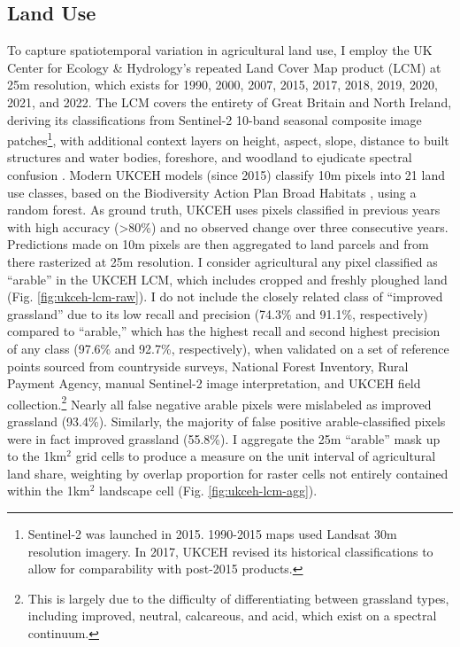 \subsection{Land Use}
To capture spatiotemporal variation in agricultural land use, I employ the UK Center for Ecology \& Hydrology's repeated Land Cover Map product (LCM) at 25m resolution, which exists for 1990, 2000, 2007, 2015, 2017, 2018, 2019, 2020, 2021, and 2022. The LCM covers the entirety of Great Britain and North Ireland, deriving its classifications from Sentinel-2 10-band seasonal composite image patches\footnote{Sentinel-2 was launched in 2015. 1990-2015 maps used Landsat 30m resolution imagery. In 2017, UKCEH revised its historical classifications to allow for comparability with post-2015 products.}, with additional context layers on height, aspect, slope, distance to built structures and water bodies, foreshore, and woodland to ejudicate spectral confusion \citep{noauthor_ukceh_2024}. Modern UKCEH models (since 2015) classify 10m pixels into 21 land use classes, based on the Biodiversity Action Plan Broad Habitats \citep{jackson_guidance_2000}, using a random forest. As ground truth, UKCEH uses pixels classified in previous years with high accuracy (>80\%) and no observed change over three consecutive years. Predictions made on 10m pixels are then aggregated to land parcels and from there rasterized at 25m resolution. I consider agricultural any pixel classified as ``arable'' in the UKCEH LCM, which includes cropped and freshly ploughed land (Fig. \ref{fig:ukceh-lcm-raw}). I do not include the closely related class of ``improved grassland'' due to its low recall and precision (74.3\% and 91.1\%, respectively) compared to ``arable,'' which has the highest recall and second highest precision of any class (97.6\% and 92.7\%, respectively), when validated on a set of reference points sourced from countryside surveys, National Forest Inventory, Rural Payment Agency, manual Sentinel-2 image interpretation, and UKCEH field collection.\footnote{This is largely due to the difficulty of differentiating between grassland types, including improved, neutral, calcareous, and acid, which exist on a spectral continuum.} Nearly all false negative arable pixels were mislabeled as improved grassland (93.4\%). Similarly, the majority of false positive arable-classified pixels were in fact improved grassland (55.8\%). I aggregate the 25m ``arable'' mask up to the 1km$^2$ grid cells to produce a measure on the unit interval of agricultural land share, weighting by overlap proportion for raster cells not entirely contained within the 1km$^2$ landscape cell (Fig. \ref{fig:ukceh-lcm-agg}). 

